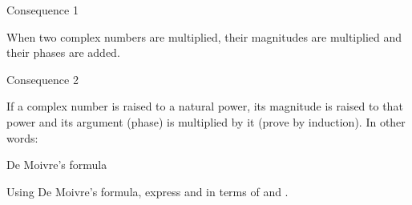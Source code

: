 \begin{EMimportant}{}


\end{EMimportant}

\begin{EMremark}{Consequence 1}

When two complex numbers are multiplied, their magnitudes are multiplied and their phases are added.

\end{EMremark}

\begin{EMremark}{Consequence 2}

If a complex number is raised to a natural power, its magnitude is raised to that power and its argument (phase) is multiplied by it (prove by induction). In other words:

\end{EMremark}

\begin{EMunit}


\end{EMunit}

\begin{EMimportant}{De Moivre's formula}


\end{EMimportant}

\begin{EMexercise}{}

Using De Moivre's formula, express  and  in terms of \EMim{\cos\theta} and \EMim{\sin\theta}.

\end{EMexercise}

\EMhold


\begin{EMunit}






\end{EMunit}


